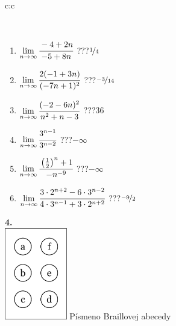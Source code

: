 \documentclass[10pt]{report}
\begin{document}
\begin{tabular}{c:c}
\begin{minipage}[c][104.5mm][t]{0.5\linewidth}
\begin{center}
\begin{minipage}{0.95\linewidth}
\begin{center}
\end{center}
\end{minipage}
\\[1mm]
\begin{minipage}{0.79\linewidth}
\begin{center}
\begin{varwidth}{\linewidth}
\begin{enumerate}
\normalsize
\item $\lim\limits_{n\to\infty}\cfrac{-4+2n}{-5+8n}$\quad \dotfill\; ???\;\dotfill \quad $\nicefrac{1}{4}$
\item $\lim\limits_{n\to\infty}\cfrac{2(-1+3n)}{(-7n+1)^2}$\quad \dotfill\; ???\;\dotfill \quad $\nicefrac{-3}{14}$
\item $\lim\limits_{n\to\infty}\cfrac{(-2-6n)^2}{n^2+n-3}$\quad \dotfill\; ???\;\dotfill \quad $36$
\item $\lim\limits_{n\to\infty}\cfrac{3^{n-1}}{3^{n-2}}$\quad \dotfill\; ???\;\dotfill \quad $-\infty$
\item $\lim\limits_{n\to\infty}\cfrac{\left(\frac{1}{2}\right)^n +1}{-n^{-9}}$\quad \dotfill\; ???\;\dotfill \quad $-\infty$
\item $\lim\limits_{n\to\infty}\cfrac{3\cdot 2^{n+2}-6\cdot 3^{n-2}}{4\cdot 3^{n-1}+3\cdot 2^{n+2}}$\quad \dotfill\; ???\;\dotfill \quad $\nicefrac{-9}{2}$
\end{enumerate}
\end{varwidth}
\end{center}
\end{minipage}
\begin{minipage}{0.20\linewidth}
\begin{center}
{\Huge\bfseries 4.} \\[2mm]
\includegraphics[height=40mm]{../images/braille.png}
{\small Písmeno Braillovej abecedy}
\end{center}
\end{minipage}
\end{center}
\end{minipage}
%
\end{tabular}
\newpage
\thispagestyle{empty}
\end{document}
